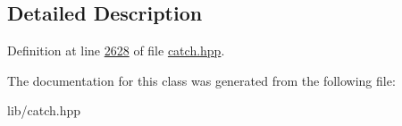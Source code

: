 \subsection{Detailed Description}


Definition at line \mbox{\hyperlink{catch_8hpp_source_l02628}{2628}} of file \mbox{\hyperlink{catch_8hpp_source}{catch.\+hpp}}.



The documentation for this class was generated from the following file\+:\begin{DoxyCompactItemize}
\item 
lib/catch.\+hpp\end{DoxyCompactItemize}
